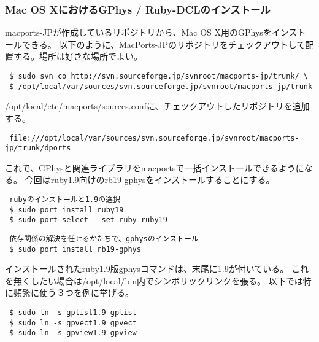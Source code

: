 \vspace{1cm}
 \hrulefill
\subsubsection{Mac OS XにおけるGPhys / Ruby-DCLのインストール}

macports-JPが作成しているリポジトリから、Mac OS X用のGPhysをインストールできる。
以下のように、MacPorts-JPのリポジトリをチェックアウトして配置する。場所は好きな場所でよい。
\begin{verbatim}
 $ sudo svn co http://svn.sourceforge.jp/svnroot/macports-jp/trunk/ \
 $ /opt/local/var/sources/svn.sourceforge.jp/svnroot/macports-jp/trunk
\end{verbatim}
/opt/local/etc/macports/sources.confに、チェックアウトしたリポジトリを追加する。
\begin{verbatim}
 file:///opt/local/var/sources/svn.sourceforge.jp/svnroot/macports-jp/trunk/dports
\end{verbatim}
これで、GPhysと関連ライブラリをmacportsで一括インストールできるようになる。
今回はruby1.9向けのrb19-gphysをインストールすることにする。

\begin{verbatim}
 rubyのインストールと1.9の選択
 $ sudo port install ruby19
 $ sudo port select --set ruby ruby19
\end{verbatim}
\begin{verbatim}
 依存関係の解決を任せるかたちで、gphysのインストール
 $ sudo port install rb19-gphys
\end{verbatim}

インストールされたruby1.9版gphysコマンドは、末尾に1.9が付いている。
これを無くしたい場合は/opt/local/bin内でシンボリックリンクを張る。
以下では特に頻繁に使う３つを例に挙げる。
\begin{verbatim}
 $ sudo ln -s gplist1.9 gplist
 $ sudo ln -s gpvect1.9 gpvect
 $ sudo ln -s gpview1.9 gpview
\end{verbatim}



